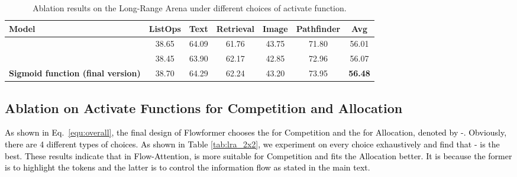 \documentclass[nohyperref]{article}
\theoremstyle{plain}
\theoremstyle{definition}
\theoremstyle{remark}
\newcommand{\update}[1]{{\textcolor{black}{#1}}}
\begin{document}
\begin{table*}[h]
	\caption{Ablation results on the Long-Range Arena under different choices of activate function.}
	\vspace{-5pt}
	\label{tab:ablation_in_phi}
	\vskip 0.15in
	\centering
	\begin{small}
		\begin{sc}
			\renewcommand{\multirowsetup}{\centering}
			\setlength{\tabcolsep}{4.3pt}
			\begin{tabular}{l|ccccc|c}
				\toprule
				Model & ListOps  & Text  & Retrieval  & Image  & Pathfinder  & Avg  \\
				\midrule
				 & 38.65 & 64.09 & 61.76 & 43.75 & 71.80 & 56.01 \\
				 & 38.45 & 63.90 & 62.17 & 42.85 &  72.96 & 56.07 \\
				\midrule
				\textbf{Sigmoid function (final version)} & 38.70 & 64.29 & 62.24 & 43.20 & 73.95 & \textbf{56.48} \\
				\bottomrule
			\end{tabular}
		\end{sc}
	\end{small}
\end{table*}

\subsection{Ablation on Activate Functions for Competition and Allocation}

\update{As shown in Eq.~\eqref{equ:overall}, the final design of Flowformer chooses the  for Competition and the  for Allocation, denoted by -. Obviously, there are 4 different types of choices. As shown in Table \ref{tab:lra_2x2}, we experiment on every choice exhaustively and find that - is the best. These results indicate that in Flow-Attention,  is more suitable for Competition and  fits the Allocation better. It is because the former is to highlight the tokens and the latter is to control the information flow as stated in the main text.}
\end{document}
